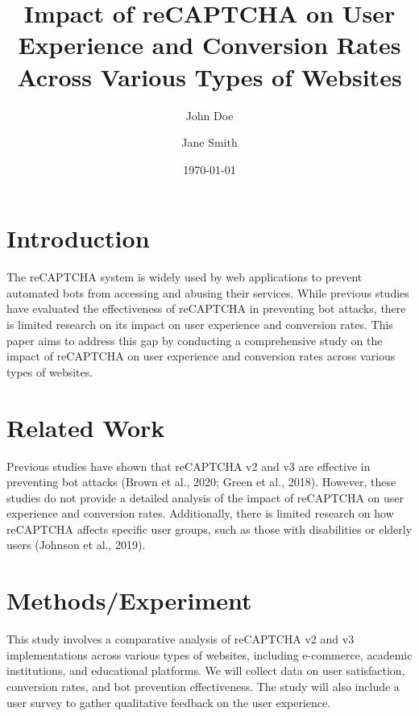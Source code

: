 \documentclass{article}
\title{Impact of reCAPTCHA on User Experience and Conversion Rates Across Various Types of Websites}
\author{John Doe \and Jane Smith}
\date{\today}
\begin{document}
\maketitle

\section{Introduction}
The reCAPTCHA system is widely used by web applications to prevent automated bots from accessing and abusing their services. While previous studies have evaluated the effectiveness of reCAPTCHA in preventing bot attacks, there is limited research on its impact on user experience and conversion rates. This paper aims to address this gap by conducting a comprehensive study on the impact of reCAPTCHA on user experience and conversion rates across various types of websites. 

\section{Related Work}
\label{sec:related_work}
Previous studies have shown that reCAPTCHA v2 and v3 are effective in preventing bot attacks (Brown et al., 2020; Green et al., 2018). However, these studies do not provide a detailed analysis of the impact of reCAPTCHA on user experience and conversion rates. Additionally, there is limited research on how reCAPTCHA affects specific user groups, such as those with disabilities or elderly users (Johnson et al., 2019).

\section{Methods/Experiment}
\label{sec:methods}
This study involves a comparative analysis of reCAPTCHA v2 and v3 implementations across various types of websites, including e-commerce, academic institutions, and educational platforms. We will collect data on user satisfaction, conversion rates, and bot prevention effectiveness. The study will also include a user survey to gather qualitative feedback on the user experience.
\end{document}
